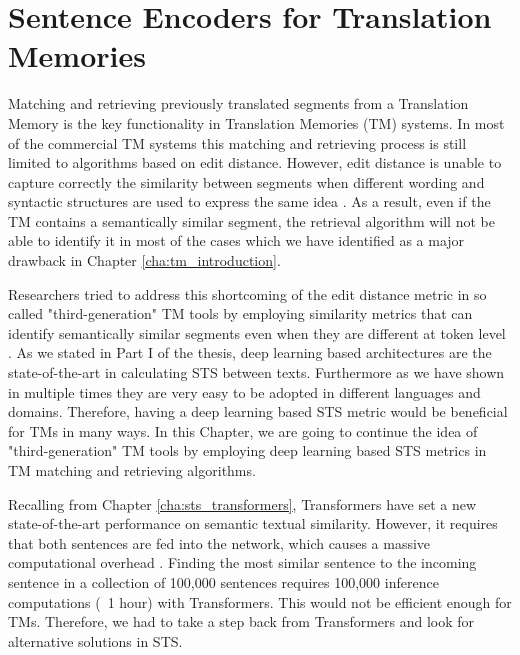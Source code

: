 \chapter{\label{cha:tm_sentence_encoders}Sentence Encoders for Translation Memories}
Matching and retrieving previously translated segments from a Translation Memory is the key functionality in Translation Memories (TM) systems. In most of the commercial TM systems this matching and retrieving process is still limited to algorithms based on edit distance. However, edit distance is unable to capture correctly the similarity between segments when different wording and syntactic structures are used to express the same idea \citet{mitkov2008improving}. As a result, even if the TM contains a semantically similar segment, the retrieval algorithm will not be able to identify it in most of the cases which we have identified as a major drawback in Chapter \ref{cha:tm_introduction}.

Researchers tried to address this shortcoming of the edit distance metric in so called "third-generation" TM tools by employing similarity metrics that can identify semantically similar segments even when they are different at token level \cite{pekar2007new}. As we stated in Part I of the thesis, deep learning based architectures are the state-of-the-art in calculating STS between texts. Furthermore as we have shown in multiple times they are very easy to be adopted in different languages and domains. Therefore, having a deep learning based STS metric would be beneficial for TMs in many ways. In this Chapter, we are going to continue the idea of "third-generation" TM tools by employing deep learning based STS metrics in TM matching and retrieving algorithms. 

Recalling from Chapter \ref{cha:sts_transformers}, Transformers have set a new state-of-the-art performance on semantic textual similarity. However, it requires that both sentences are fed into the network, which causes a massive computational overhead \cite{reimers-gurevych-2019-sentence}. Finding the most similar sentence to the incoming sentence in a collection of 100,000 sentences requires 100,000 inference computations (~1 hour) with Transformers. This would not be efficient enough for TMs. Therefore, we had to take a step back from Transformers and look for alternative solutions in STS. 

